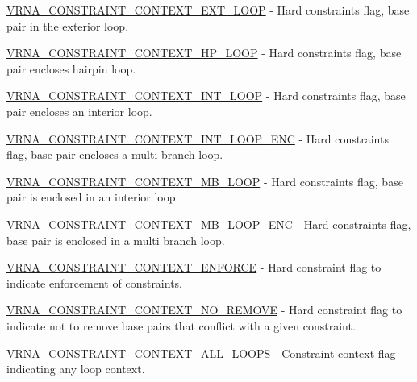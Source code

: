 \begin{DoxyItemize}
\item \mbox{\hyperlink{group__hard__constraints_ga9418eda62a5dec070896702c279d2548}{V\+R\+N\+A\+\_\+\+C\+O\+N\+S\+T\+R\+A\+I\+N\+T\+\_\+\+C\+O\+N\+T\+E\+X\+T\+\_\+\+E\+X\+T\+\_\+\+L\+O\+OP}} -\/ Hard constraints flag, base pair in the exterior loop.
\item \mbox{\hyperlink{group__hard__constraints_ga79203702b197b6b9d3b78eed40663eb1}{V\+R\+N\+A\+\_\+\+C\+O\+N\+S\+T\+R\+A\+I\+N\+T\+\_\+\+C\+O\+N\+T\+E\+X\+T\+\_\+\+H\+P\+\_\+\+L\+O\+OP}} -\/ Hard constraints flag, base pair encloses hairpin loop.
\item \mbox{\hyperlink{group__hard__constraints_ga21feeab3a9e5fa5a9e3d9ac0fcf5994f}{V\+R\+N\+A\+\_\+\+C\+O\+N\+S\+T\+R\+A\+I\+N\+T\+\_\+\+C\+O\+N\+T\+E\+X\+T\+\_\+\+I\+N\+T\+\_\+\+L\+O\+OP}} -\/ Hard constraints flag, base pair encloses an interior loop.
\item \mbox{\hyperlink{group__hard__constraints_ga0536288e04ff6332ecdc23ca4705402b}{V\+R\+N\+A\+\_\+\+C\+O\+N\+S\+T\+R\+A\+I\+N\+T\+\_\+\+C\+O\+N\+T\+E\+X\+T\+\_\+\+I\+N\+T\+\_\+\+L\+O\+O\+P\+\_\+\+E\+NC}} -\/ Hard constraints flag, base pair encloses a multi branch loop.
\item \mbox{\hyperlink{group__hard__constraints_ga456ecd2ff00056bb64da8dd4f61bbfc5}{V\+R\+N\+A\+\_\+\+C\+O\+N\+S\+T\+R\+A\+I\+N\+T\+\_\+\+C\+O\+N\+T\+E\+X\+T\+\_\+\+M\+B\+\_\+\+L\+O\+OP}} -\/ Hard constraints flag, base pair is enclosed in an interior loop.
\item \mbox{\hyperlink{group__hard__constraints_ga02a3d703ddbcfce393e4bbfcb9db7077}{V\+R\+N\+A\+\_\+\+C\+O\+N\+S\+T\+R\+A\+I\+N\+T\+\_\+\+C\+O\+N\+T\+E\+X\+T\+\_\+\+M\+B\+\_\+\+L\+O\+O\+P\+\_\+\+E\+NC}} -\/ Hard constraints flag, base pair is enclosed in a multi branch loop.
\item \mbox{\hyperlink{constraints__hard_8h_a1aa55f2c6347e670e003b1a765632dad}{V\+R\+N\+A\+\_\+\+C\+O\+N\+S\+T\+R\+A\+I\+N\+T\+\_\+\+C\+O\+N\+T\+E\+X\+T\+\_\+\+E\+N\+F\+O\+R\+CE}} -\/ Hard constraint flag to indicate enforcement of constraints.
\item \mbox{\hyperlink{constraints__hard_8h_a9fcac36535850ff612c7e6b1305304a1}{V\+R\+N\+A\+\_\+\+C\+O\+N\+S\+T\+R\+A\+I\+N\+T\+\_\+\+C\+O\+N\+T\+E\+X\+T\+\_\+\+N\+O\+\_\+\+R\+E\+M\+O\+VE}} -\/ Hard constraint flag to indicate not to remove base pairs that conflict with a given constraint.
\item \mbox{\hyperlink{group__hard__constraints_ga886d9127c49bb982a4b67cd7581e8a5a}{V\+R\+N\+A\+\_\+\+C\+O\+N\+S\+T\+R\+A\+I\+N\+T\+\_\+\+C\+O\+N\+T\+E\+X\+T\+\_\+\+A\+L\+L\+\_\+\+L\+O\+O\+PS}} -\/ Constraint context flag indicating any loop context.
\end{DoxyItemize}

